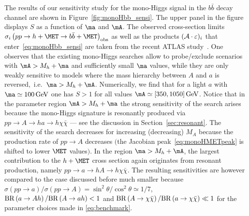 The results of our sensitivity study for the mono-Higgs signal in the $b \bar b$ decay channel are shown in Figure~\ref{fig:monoHbb_sensi}. The upper panel in the figure displays $S$  as a function of $\ma$ and $\mA$. The observed cross-section limits $\sigma_{i} \left ( p p \to h + \MET \to b \bar b + \MET \right)_{\rm obs}$ as well as the products $({\cal A} \cdot  \varepsilon)_i$ that enter~\eqref{eq:monoHbb_sensi}  are  taken from the recent ATLAS study~\cite{Aaboud:2017yqz}. One observes that the existing mono-Higgs searches allow to probe/exclude \hdma scenarios with  $\mA > M_h + \ma$  and sufficiently small $\ma$ values, while they are only weakly  sensitive to models where the mass hierarchy between $A$ and $a$ is reversed,~i.e.~$\ma > M_h + \mA$. Numerically, we find that  for  a light $a$ with $\ma \simeq 100 \, {\rm GeV}$ one has $S > 1$ for all values $\mA \simeq [350, 1050] \, {\rm GeV}$. Notice that in the parameter region  $\mA > M_h + \ma$ the strong sensitivity of the search arises because the mono-Higgs signature is resonantly produced via $pp \to A \to ha \to h \chi \bar \chi$ --- see the discussion in Section~\ref{sec:resonant}. The sensitivity of the search decreases for increasing (decreasing) $M_A$ because the production rate of $pp \to A$  decreases $\big($the Jacobian peak~\eqref{eq:monoHMETpeak} is shifted to lower $\MET$ values$\big)$. In the region $\ma > M_h + \mA$, the largest contribution to the $h + \MET$ cross section again originates from resonant production, namely $pp \to a \to hA \to h \chi \bar \chi$. The resulting sensitivities are however compared to the case discussed before much smaller because  $\sigma \left (p p \to a \right )/\sigma \left (pp \to A \right ) = \sin^2 \theta/\cos^2 \theta \simeq 1/7$, ${\rm BR} \left ( a \to A h \right )/{\rm BR} \left (  A \to a h  \right ) < 1$ and ${\rm BR} \left ( A \to \chi \bar \chi \right )/{\rm BR} \left (  a \to \chi \bar \chi \right ) \ll 1$ for the parameter choices made in \eqref{eq:benchmark}. 

